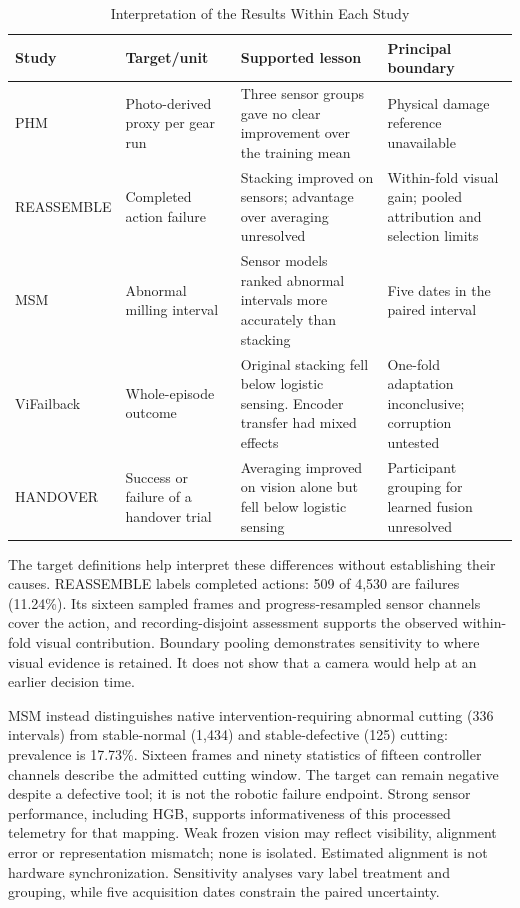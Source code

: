 \begin{table}[htbp]
\caption{Interpretation of the Results Within Each Study}\label{tab:cross-study}
\centering\small

\begin{tabularx}{\textwidth}{P{27mm}YYY}
\toprule Study & Target/unit & Supported lesson & Principal boundary\\\midrule
PHM & Photo-derived proxy per gear run & Three sensor groups gave no clear improvement
over the training mean & Physical damage reference unavailable\\
REASSEMBLE & Completed action failure & Stacking improved on sensors; advantage over
averaging unresolved & Within-fold visual gain; pooled attribution and selection
limits\\
MSM & Abnormal milling interval & Sensor models ranked abnormal intervals more
accurately than stacking & Five dates in the paired interval\\
ViFailback & Whole-episode outcome & Original stacking fell below logistic sensing.
Encoder transfer had mixed effects & One-fold adaptation inconclusive; corruption
untested\\
HANDOVER & Success or failure of a handover trial & Averaging improved on vision alone
but fell below logistic sensing & Participant grouping for learned fusion
unresolved\\\bottomrule
\end{tabularx}
\end{table}

The target definitions help interpret these differences without establishing their
causes. REASSEMBLE labels completed actions: 509 of 4,530 are failures (11.24\%). Its
sixteen sampled frames and progress-resampled sensor channels cover the action, and
recording-disjoint assessment supports the observed within-fold visual contribution.
Boundary pooling demonstrates sensitivity to where visual evidence is retained. It does
not show that a camera would help at an earlier decision time.

MSM instead distinguishes native intervention-requiring abnormal cutting (336 intervals)
from stable-normal (1,434) and stable-defective (125) cutting: prevalence is 17.73\%.
Sixteen frames and ninety statistics of fifteen controller channels describe the
admitted cutting window. The target can remain negative despite a defective tool; it is
not the robotic failure endpoint. Strong sensor performance, including HGB, supports
informativeness of this processed telemetry for that mapping. Weak frozen vision may
reflect visibility, alignment error or representation mismatch; none is isolated.
Estimated alignment is not hardware synchronization. Sensitivity analyses vary label
treatment and grouping, while five acquisition dates constrain the paired uncertainty.

